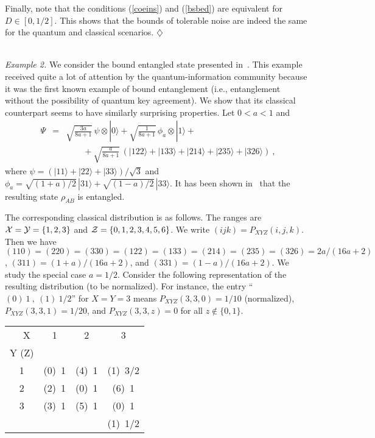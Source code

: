 \documentclass{article}
\newcommand{\exend}{\hspace*{\fill} $\diamondsuit$}
\newcommand{\noi}{\noindent}
\newcommand{\CX}{{\cal X}}
\newcommand{\CY}{{\cal Y}}
\newcommand{\CZ}{{\cal Z}}
\begin{document}
Finally, note that the conditions (\ref{coeins}) and (\ref{bsbed}) are 
equivalent for $D\in [0,1/2]$. This shows that the bounds of tolerable noise
are indeed  the same for the quantum and classical scenarios.
\exend
\\ \

\noi
{\it Example 2.}
We consider the bound entangled state presented in~\cite{HorodeckiPartialTransp}. This
example received quite a lot of attention by the quantum-information community
because it was the first known example of bound entanglement (i.e., entanglement without
the possibility of
quantum key agreement). We show that 
its classical counterpart seems to have similarly surprising properties.
 Let $0<a<1$ and
\begin{eqnarray*}
\Psi & = & \sqrt{\frac{3a}{8a+1}}\, \psi\otimes|0\rangle  +
\sqrt{\frac{1}{8a+1}}\, \phi_a\otimes|1\rangle  + \\
&& \qquad
+\sqrt{\frac{a}{8a+1}}\, (|122\rangle +|133\rangle +|214\rangle +|235\rangle +|326\rangle )\ ,
\end{eqnarray*}
where $\psi=(|11\rangle +|22\rangle +|33\rangle )/\sqrt{3}$ and 
$
\phi_a=\sqrt{(1+a)/2}\, |31\rangle +\sqrt{(1-a)/2}\, |33\rangle.
$
It has been shown in~\cite{HorodeckiPartialTransp} that the resulting state 
$\rho_{AB}$
is entangled.

The
corresponding classical
distribution is 
 as follows. The ranges are
$
\CX=\CY=\{1,2,3\}$ and $\CZ=\{0,1,2,3,4,5,6\}
$.
We write
$
(ijk)=P_{XYZ}(i,j,k)
$.
Then we have
$
(110)=(220)=(330)=(122)=(133)=(214)=(235)=(326)  =  2a/(16a+2)$,
$(311)  =  (1+a)/(16a+2)$, and 
$(331)  =  (1-a)/(16a+2)$.
We study the special case $a=1/2$. Consider the following representation
of the resulting distribution (to be normalized).
For instance,
the entry ``$(0)\ 1\ ,\ (1)\ 1/2$'' for $X=Y=3$  means 
$P_{XYZ}(3,3,0)=1/10$ (normalized),
$P_{XYZ}(3,3,1)=1/20$,
and  $P_{XYZ}(3,3,z)=0$ for all $z\not\in\{0,1\}$.
\\
\begin{center}
\begin{tabular}{|c||c|c|c|}
\hline
\ \ X & 1 & 2 & 3\\
Y (Z) &&&\\
\hline\hline
1 & (0)\ 1 & (4)\ 1 & (1)\ 3/2\\
\hline
2 & (2)\ 1 & (0)\ 1 & (6)\ 1\\
\hline
3 & (3)\ 1 & (5)\ 1 & (0)\ 1\\
&&& (1)\ 1/2\\
\hline
\end{tabular}
\end{center}
\end{document}
